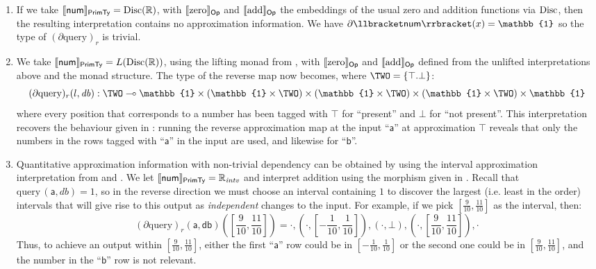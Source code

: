 \begin{enumerate}
\item If we take $\llbracket \mathsf{num} \rrbracket_{\mathsf{PrimTy}} = \mathrm{Disc}(\mathbb{R})$, with $\llbracket \mathrm{zero} \rrbracket_{\mathsf{Op}}$ and
  $\llbracket \mathrm{add} \rrbracket_{\mathsf{Op}}$ the embeddings of the usual zero and addition functions via $\mathrm{Disc}$, then the
  resulting interpretation contains no approximation information. We have
  $\partial\sem{\mathsf{num}}(x) = \mathbb{1}$ so the type of $(\partial \mathrm{query})_r$ is trivial.
\item We take $\llbracket \mathsf{num} \rrbracket_{\mathsf{PrimTy}} = L(\mathrm{Disc}(\mathbb{R}))$, using the lifting monad from
  , with $\llbracket \mathrm{zero} \rrbracket_{\mathsf{Op}}$ and
  $\llbracket \mathrm{add} \rrbracket_{\mathsf{Op}}$ defined from the unlifted interpretations above and the monad structure. The
  type of the reverse map now becomes, where $\TWO = \{\top.\bot\}$:
  \begin{equation}\label{eqn:reverse-query-approx-1}
    (\partial \mathrm{query})_r(l, \mathit{db}) : \TWO \multimap \mathbb{1} \times (\mathbb{1} \times \TWO) \times (\mathbb{1} \times \TWO) \times (\mathbb{1} \times \TWO) \times \mathbb{1}
  \end{equation}
  where every position that corresponds to a number has been tagged with $\top$ for ``present'' and $\bot$ for
  ``not present''. This interpretation recovers the behaviour given in : running
  the reverse approximation map at the input ``$\mathsf{a}$'' at approximation $\top$ reveals that only the
  numbers in the rows tagged with ``$\mathsf{a}$'' in the input are used, and likewise for ``$\mathsf{b}$''.
\item Quantitative approximation information with non-trivial dependency can be obtained by using the interval
  approximation interpretation from  and . We let
  $\llbracket \mathsf{num} \rrbracket_{\mathsf{PrimTy}} = \mathbb{R}_{\mathit{intv}}$ and interpret addition using the morphism given
  in . Recall that $\mathrm{query}\,(\mathsf{a},\mathit{db}) = 1$, so in the reverse
  direction we must choose an interval containing $1$ to discover the largest (i.e. least in the order)
  intervals that will give rise to this output as \emph{independent} changes to the input. For example, if we
  pick $[\frac{9}{10},\frac{11}{10}]$ as the interval, then:
  \begin{displaymath}
    (\partial\mathrm{query})_r(\mathsf{a},\mathsf{db})([\frac{9}{10},\frac{11}{10}]) = \cdot, (\cdot,[-\frac{1}{10},\frac{1}{10}]),(\cdot,\bot),(\cdot,[\frac{9}{10},\frac{11}{10}]), \cdot
  \end{displaymath}
  Thus, to achieve an output within $[\frac{9}{10},\frac{11}{10}]$, either the first ``$\mathsf{a}$'' row
  could be in $[-\frac{1}{10},\frac{1}{10}]$ or the second one could be in $[\frac{9}{10},\frac{11}{10}]$, and
  the number in the ``$\mathsf{b}$'' row is not relevant.
\end{enumerate}

